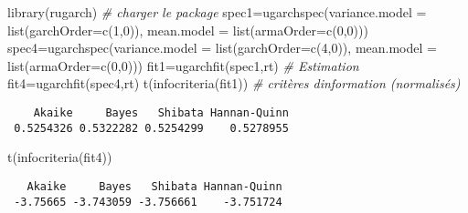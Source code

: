 \documentclass[
  ignorenonframetext,
]{beamer}
\newenvironment{Shaded}{\begin{snugshade}}{\end{snugshade}}
\newcommand{\AttributeTok}[1]{\textcolor[rgb]{0.77,0.63,0.00}{#1}}
\newcommand{\CommentTok}[1]{\textcolor[rgb]{0.56,0.35,0.01}{\textit{#1}}}
\newcommand{\DecValTok}[1]{\textcolor[rgb]{0.00,0.00,0.81}{#1}}
\newcommand{\FunctionTok}[1]{\textcolor[rgb]{0.00,0.00,0.00}{#1}}
\newcommand{\NormalTok}[1]{#1}
\newcommand{\OtherTok}[1]{\textcolor[rgb]{0.56,0.35,0.01}{#1}}
\newenvironment{Shaded}{\begin{snugshade}}{\end{snugshade}}
\newcommand{\AttributeTok}[1]{\textcolor[rgb]{0.77,0.63,0.00}{#1}}
\newcommand{\CommentTok}[1]{\textcolor[rgb]{0.56,0.35,0.01}{\textit{#1}}}
\newcommand{\DecValTok}[1]{\textcolor[rgb]{0.00,0.00,0.81}{#1}}
\newcommand{\FunctionTok}[1]{\textcolor[rgb]{0.00,0.00,0.00}{#1}}
\newcommand{\NormalTok}[1]{#1}
\newcommand{\OtherTok}[1]{\textcolor[rgb]{0.56,0.35,0.01}{#1}}
\begin{document}
\begin{frame}[fragile]
\begin{Shaded}
\begin{Highlighting}[]
\FunctionTok{library}\NormalTok{(rugarch)   }\CommentTok{\# charger le package}
\NormalTok{spec1}\OtherTok{=}\FunctionTok{ugarchspec}\NormalTok{(}\AttributeTok{variance.model =} \FunctionTok{list}\NormalTok{(}\AttributeTok{garchOrder=}\FunctionTok{c}\NormalTok{(}\DecValTok{1}\NormalTok{,}\DecValTok{0}\NormalTok{)),}
                \AttributeTok{mean.model =} \FunctionTok{list}\NormalTok{(}\AttributeTok{armaOrder=}\FunctionTok{c}\NormalTok{(}\DecValTok{0}\NormalTok{,}\DecValTok{0}\NormalTok{)))}
\NormalTok{spec4}\OtherTok{=}\FunctionTok{ugarchspec}\NormalTok{(}\AttributeTok{variance.model =} \FunctionTok{list}\NormalTok{(}\AttributeTok{garchOrder=}\FunctionTok{c}\NormalTok{(}\DecValTok{4}\NormalTok{,}\DecValTok{0}\NormalTok{)),}
                \AttributeTok{mean.model =} \FunctionTok{list}\NormalTok{(}\AttributeTok{armaOrder=}\FunctionTok{c}\NormalTok{(}\DecValTok{0}\NormalTok{,}\DecValTok{0}\NormalTok{)))}
\NormalTok{fit1}\OtherTok{=}\FunctionTok{ugarchfit}\NormalTok{(spec1,rt)  }\CommentTok{\# Estimation}
\NormalTok{fit4}\OtherTok{=}\FunctionTok{ugarchfit}\NormalTok{(spec4,rt)}
\FunctionTok{t}\NormalTok{(}\FunctionTok{infocriteria}\NormalTok{(fit1))  }\CommentTok{\# critères d\textquotesingle{}information (normalisés)}
\end{Highlighting}
\end{Shaded}
\begin{verbatim}
    Akaike     Bayes   Shibata Hannan-Quinn
 0.5254326 0.5322282 0.5254299    0.5278955
\end{verbatim}
\begin{Shaded}
\begin{Highlighting}[]
\FunctionTok{t}\NormalTok{(}\FunctionTok{infocriteria}\NormalTok{(fit4))}
\end{Highlighting}
\end{Shaded}
\begin{verbatim}
   Akaike     Bayes   Shibata Hannan-Quinn
 -3.75665 -3.743059 -3.756661    -3.751724
\end{verbatim}
\end{frame}
\end{document}
